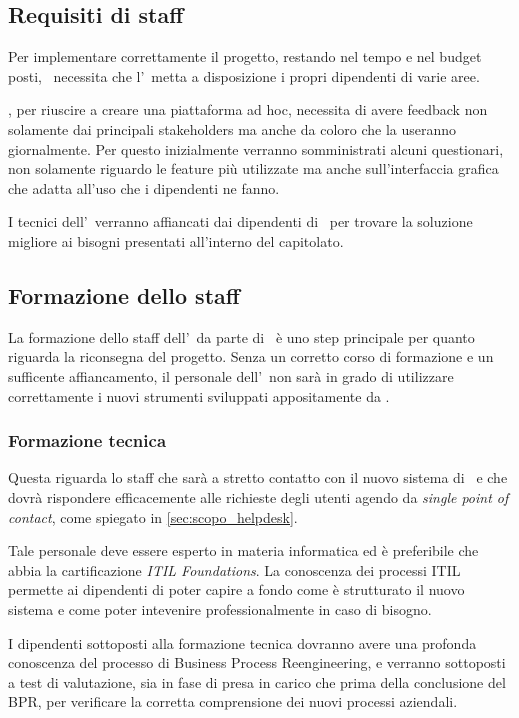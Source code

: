 	\subsection{Requisiti di staff}
	
		Per implementare correttamente il progetto, restando nel tempo e nel budget posti, \azienda~necessita che l'\istituto~metta a disposizione i propri dipendenti di varie aree.
		
		\azienda, per riuscire a creare una piattaforma ad hoc, necessita di avere feedback non solamente dai principali stakeholders ma anche da coloro che la useranno giornalmente.
		Per questo inizialmente verranno somministrati alcuni questionari, non solamente riguardo le feature più utilizzate ma anche sull'interfaccia grafica che adatta all'uso che i dipendenti ne fanno.
		
		I tecnici dell'\istituto~verranno affiancati dai dipendenti di \azienda~per trovare la soluzione migliore ai bisogni presentati all'interno del capitolato.
	
	\subsection{Formazione dello staff}
	
		La formazione dello staff dell'\istituto~da parte di \azienda~è uno step principale per quanto riguarda la riconsegna del progetto.
		Senza un corretto corso di formazione e un sufficente affiancamento, il personale dell'\istituto~non sarà in grado di utilizzare correttamente i nuovi strumenti sviluppati appositamente da \azienda.
	
		\subsubsection{Formazione tecnica}
			
			Questa riguarda lo staff che sarà a stretto contatto con il nuovo sistema di \helpdesk~e che dovrà rispondere efficacemente alle richieste degli utenti agendo da \textit{single point of contact}, come spiegato in \ref{sec:scopo_helpdesk}.
		
			Tale personale deve essere esperto in materia informatica ed è preferibile che abbia la cartificazione \textit{ITIL Foundations}.
			La conoscenza dei processi ITIL permette ai dipendenti di poter capire a fondo come è strutturato il nuovo sistema e come poter intevenire professionalmente in caso di bisogno.
			
			I dipendenti sottoposti alla formazione tecnica dovranno avere una profonda conoscenza del processo di Business Process Reengineering, e verranno sottoposti a test di valutazione, sia in fase di presa in carico che prima della conclusione del BPR, per verificare la corretta comprensione dei nuovi processi aziendali.
			
